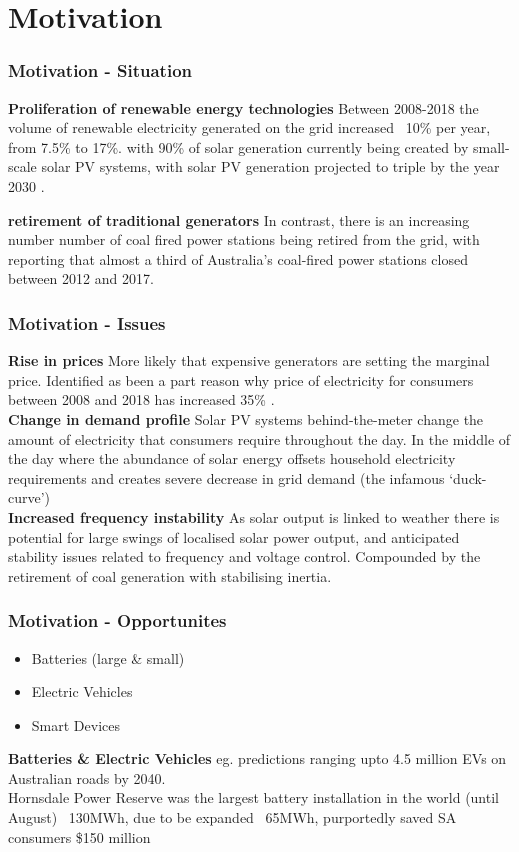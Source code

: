 \documentclass{beamer}
\begin{document}
\section{Motivation}

\begin{frame}
\frametitle{Motivation - Situation}

\textbf{Proliferation of renewable energy technologies}
Between 2008-2018 the volume of renewable electricity generated on the grid increased ~10\% per year, from 7.5\% to 17\%. \cite{departmentoftheenvironmentenergy2018}
with 90\% of solar generation currently being created by small-scale solar PV systems, with solar PV generation projected to triple by the year 2030 \cite{australianenergymarketoperatorlimited2018}.

\textbf{retirement of traditional generators}
In contrast, there is an increasing number number of coal fired power stations being retired from the grid,
with reporting that almost a third of Australia's coal-fired power stations closed between 2012 and 2017. \cite{doi:10.1111/1467-8489.12289}
\end{frame}


\begin{frame}
\frametitle{Motivation - Issues}
\textbf{Rise in prices}
More likely that expensive generators are setting the marginal price.
Identified as been a part reason why price of electricity for consumers between 2008 and 2018 has increased 35\% \cite{australiancompetitionconsumercommission2018}.\\

\textbf{Change in demand profile}
Solar PV systems behind-the-meter change the amount of electricity that consumers require throughout the day.
In the middle of the day where the abundance of solar energy offsets household electricity requirements and creates severe decrease in grid demand (the infamous `duck-curve') \\

\textbf{Increased frequency instability}
As solar output is linked to weather there is potential for large swings of localised solar power output, and anticipated stability issues related to frequency and voltage control. \cite{australianenergymarketoperatorlimited2018}
Compounded by the retirement of coal generation with stabilising inertia.
\end{frame}

\begin{frame}
\frametitle{Motivation - Opportunites}
\begin{itemize}
\item	Batteries (large \& small)
\item	Electric Vehicles
\item	Smart Devices
\end{itemize}
\textbf{Batteries \& Electric Vehicles}
eg.
predictions ranging upto 4.5 million EVs on Australian roads by 2040. \cite{australianenergymarketoperatorlimited2019}\\
Hornsdale Power Reserve was the largest battery installation in the world (until August) ~130MWh, due to be expanded ~65MWh, purportedly saved SA consumers \$150 million
\end{frame}
\end{document}
